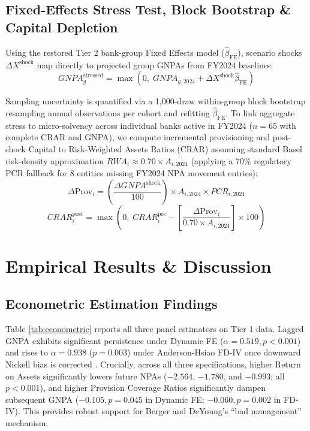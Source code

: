 \documentclass[conference]{IEEEtran}
\begin{document}
\subsection{Fixed-Effects Stress Test, Block Bootstrap \& Capital Depletion}
Using the restored Tier 2 bank-group Fixed Effects model ($\hat{\beta}_{\text{FE}}$), scenario shocks $\Delta X^{\text{shock}}$ map directly to projected group GNPAs from FY2024 baselines:
\begin{equation}
GNPA_g^{\text{stressed}} = \max\left( 0, \; GNPA_{g,2024} + \Delta X^{\text{shock}} \hat{\beta}_{\text{FE}} \right)
\end{equation}

Sampling uncertainty is quantified via a 1,000-draw within-group block bootstrap resampling annual observations per cohort and refitting $\hat{\beta}_{\text{FE}}$. To link aggregate stress to micro-solvency across individual banks active in FY2024 ($n = 65$ with complete CRAR and GNPA), we compute incremental provisioning and post-shock Capital to Risk-Weighted Assets Ratios (CRAR) assuming standard Basel risk-density approximation $RWA_i \approx 0.70 \times A_{i,2024}$ (applying a 70\% regulatory PCR fallback for 8 entities missing FY2024 NPA movement entries):
\begin{equation}
\Delta \text{Prov}_i = \left(\frac{\Delta GNPA^{\text{shock}}}{100}\right) \times A_{i,2024} \times PCR_{i,2024}
\end{equation}
\begin{equation}
CRAR_i^{\text{post}} = \max\left( 0, \; CRAR_i^{\text{pre}} - \left[\frac{\Delta \text{Prov}_i}{0.70 \times A_{i,2024}}\right] \times 100 \right)
\end{equation}

\section{Empirical Results \& Discussion}
\subsection{Econometric Estimation Findings}
Table \ref{tab:econometric} reports all three panel estimators on Tier 1 data. Lagged GNPA exhibits significant persistence under Dynamic FE ($\alpha = 0.519, p < 0.001$) and rises to $\alpha = 0.938$ ($p = 0.003$) under Anderson-Hsiao FD-IV once downward Nickell bias is corrected \cite{arellano1991}. Crucially, across all three specifications, higher Return on Assets significantly lowers future NPAs ($-2.564$, $-1.780$, and $-0.993$; all $p < 0.001$), and higher Provision Coverage Ratios significantly dampen subsequent GNPA ($-0.105, p = 0.045$ in Dynamic FE; $-0.060, p = 0.002$ in FD-IV). This provides robust support for Berger and DeYoung's \cite{berger1997} ``bad management'' mechanism.
\end{document}
